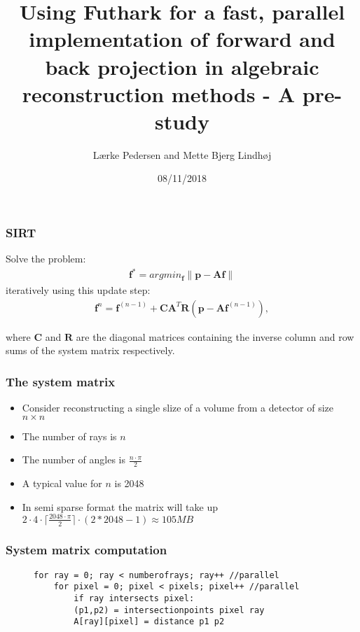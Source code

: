 \documentclass{beamer}
\title[Pre-study]{Using Futhark for a fast, parallel implementation of forward and back projection in algebraic reconstruction methods - A pre-study} %
\author{L\ae rke Pedersen and Mette Bjerg Lindh\o j} %
\institute[DIKU] %
{
University of Copenhagen\\ %
}
\date{08/11/2018} %
\newcommand{\norm}[1]{\left\lVert#1\right\rVert}
\renewcommand{\vec}[1]{\ensuremath{\boldsymbol{#1}}}
\newcommand{\mat}[1]{\ensuremath{\boldsymbol{#1}}}
\newcommand{\inputTikZ}[2]{%
     \scalebox{#1}{}
}
\begin{document}
\begin{frame}
\titlepage %
\end{frame}

\begin{frame}
\frametitle{SIRT}
Solve the problem:
\begin{align}
\vec{f}^{\ast}=argmin_{\vec{f}}\norm{\vec{p}-\mat{A}\vec{f}}
\end{align}
iteratively using this update step:
\begin{align}
\vec{f}^{n} = \vec{f}^{(n-1)}+\mat{C}\mat{A}^{T}\mat{R}(\vec{p}-\mat{A}\vec{f}^{(n-1)}),
\end{align}

where $\mat{C}$ and $\mat{R}$ are the diagonal matrices containing the inverse column and row sums of the system matrix respectively.
\end{frame}

\begin{frame}
\frametitle{The system matrix}
\inputTikZ{1}{figures/weightings.tex}
\end{frame}

\begin{frame}
\begin{itemize}
\item{Consider reconstructing a single slize of a volume from a detector of size $n\times n$}
\item{The number of rays is $n$}
\item{The number of angles is $\frac{n\cdot\pi}{2}$}
\item{A typical value for $n$ is 2048 }
\item{In semi sparse format the matrix will take up $2\cdot4\cdot\lceil\frac{2048\cdot\pi}{2}\rceil\cdot (2*2048-1)\approx 105MB$}
\end{itemize}
\end{frame}

\begin{frame}[fragile]
\frametitle{System matrix computation}
\begin{figure}[!h]
\begin{lstlisting}[frame=single]
for ray = 0; ray < numberofrays; ray++ //parallel
	for pixel = 0; pixel < pixels; pixel++ //parallel
		if ray intersects pixel:
        (p1,p2) = intersectionpoints pixel ray
        A[ray][pixel] = distance p1 p2
\end{lstlisting}
\end{figure}
\end{frame}
\end{document}
